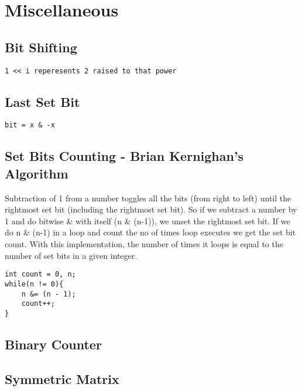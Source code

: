 \section{Miscellaneous}

\subsection{Bit Shifting}
\begin{lstlisting}[style=CStyle]
1 << i reperesents 2 raised to that power
\end{lstlisting}


\subsection{Last Set Bit}
\begin{lstlisting}[style=CStyle]
bit = x & -x
\end{lstlisting}

\subsection{Set Bits Counting - Brian Kernighan's Algorithm}
Subtraction of 1 from a number toggles all the bits (from right to left) until the rightmost set bit (including the rightmost set bit). So if we subtract a number by 1 and do bitwise \& with itself (n \& (n-1)), we unset the rightmost set bit. If we do n \& (n-1) in a loop and count the no of times loop executes we get the set bit count.
With this implementation, the number of times it loops is equal to the number of set bits in a given integer.
\begin{lstlisting}[style=CStyle]
int count = 0, n;
while(n != 0){
	n &= (n - 1);
	count++;
}
\end{lstlisting}


\subsection{Binary Counter}



\subsection{Symmetric Matrix}
\begin{lstlisting}

\end{lstlisting}
